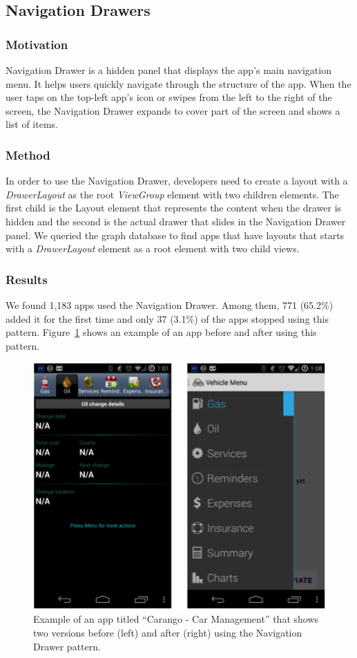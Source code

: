 \subsection{Navigation Drawers}
\subsubsection{Motivation}
Navigation Drawer is a hidden panel that displays the app's main navigation menu. 
It helps users quickly navigate through the structure of the app. 
When the user taps on the top-left app's icon or swipes from the left to the right of the screen, the Navigation Drawer expands to cover part of the screen and shows a list of items.

\subsubsection{Method}
In order to use the Navigation Drawer, developers need to create a layout with a \textit{DrawerLayout} as the root \textit{ViewGroup} element with two children elements. 
The first child is the Layout element that represents the content when the drawer is hidden and the second is the actual drawer that slides in the Navigation Drawer panel. 
We queried the graph database to find apps that have layouts that starts with a \textit{DrawerLayout} element as a root element with two child views.
\subsubsection{Results}
We found 1,183 apps used the Navigation Drawer. 
Among them, 771 (65.2\%) added it for the first time and only 37 (3.1\%) of the apps stopped using this pattern. Figure~\ref{fig:fig_drawer} shows an example of an app before and after using this pattern.
\begin{figure}[!t]
	\centering
	\includegraphics{figures/design-pattern-changes/drawer}
	\caption{Example of an app titled ``Carango - Car Management'' that shows two versions before (left) and after (right) using the Navigation Drawer pattern.}
	\label{fig:fig_drawer}
\end{figure}
